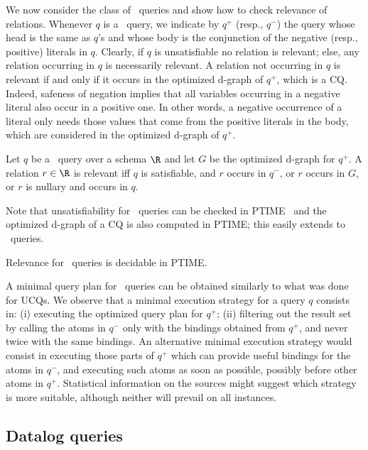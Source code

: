 We now consider the class of \CQnot \ queries and show how to check relevance of relations.
Whenever $q$ is a \CQnot \ query, we indicate by $q^{+}$ (resp., $q^{-}$) the query whose head is the same as $q$'s and whose body is the conjunction of the negative (resp., positive) literals in $q$.
%
Clearly, if $q$ is unsatisfiable no relation is relevant;
else, any relation occurring in $q$ is necessarily relevant. A relation not occurring in $q$ is relevant if and only if it occurs in the optimized d-graph of $q^+$, which is a CQ. Indeed, safeness of negation implies that all variables occurring in a negative literal also occur in a positive one. In other words, a negative occurrence of a literal only needs those values that come from the positive literals in the body, which are considered in the optimized d-graph of $q^+$.
%
\begin{theorem}\label{the:dgraph-relevant-cqnot}
  Let $q$ be a \CQnot \ query over a schema $\R$ and let $G$ be the optimized d-graph for $q^+$.
  A relation $r\in\R$ is relevant iff $q$ is satisfiable, and
  \myi $r$ occurs in $q^{-}$, or
  \myii $r$ occurs in $G$, or
  \myiii $r$ is nullary and occurs in $q$.
\end{theorem}
%
Note that unsatisfiability for \CQnot \ queries can be checked in PTIME~\cite{LuNa04a} and the optimized d-graph of a CQ is also computed in PTIME;
this easily extends to \UCQnot \ queries.
%
\begin{corollary}
Relevance for \UCQnot \ queries is decidable in PTIME.
\end{corollary}
%
A %
minimal query plan for \UCQnot \ queries can be obtained similarly to what was done for UCQs.
%
We observe that a %
minimal execution strategy for a \CQnot query $q$ consists in: (i) executing the optimized query plan for $q^+$; (ii) filtering out the result set by calling the atoms in $q^-$ only with the bindings obtained from $q^+$, and never twice with the same bindings.
%
An alternative %
minimal execution strategy would consist in executing those parts of $q^+$ which can provide useful bindings for the atoms in $q^-$, and executing such atoms as soon as possible, possibly before other atoms in $q^+$.
%
Statistical information on the sources might suggest which strategy is more suitable, although neither will prevail on all instances.

\subsection{Datalog queries}\label{sec:datalog}

